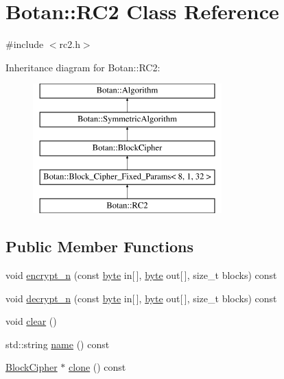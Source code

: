 \hypertarget{classBotan_1_1RC2}{\section{Botan\-:\-:R\-C2 Class Reference}
\label{classBotan_1_1RC2}
}


{\ttfamily \#include $<$rc2.\-h$>$}

Inheritance diagram for Botan\-:\-:R\-C2\-:\begin{figure}[H]
\begin{center}
\leavevmode
\includegraphics[height=5.000000cm]{classBotan_1_1RC2}
\end{center}
\end{figure}
\subsection*{Public Member Functions}
\begin{DoxyCompactItemize}
\item 
void \hyperlink{classBotan_1_1RC2_ab44b8601d594d4e5502d0b4cf01f0440}{encrypt\-\_\-n} (const \hyperlink{namespaceBotan_a7d793989d801281df48c6b19616b8b84}{byte} in\mbox{[}$\,$\mbox{]}, \hyperlink{namespaceBotan_a7d793989d801281df48c6b19616b8b84}{byte} out\mbox{[}$\,$\mbox{]}, size\-\_\-t blocks) const 
\item 
void \hyperlink{classBotan_1_1RC2_ac6135fcb2c2258de5bd06f48def26dca}{decrypt\-\_\-n} (const \hyperlink{namespaceBotan_a7d793989d801281df48c6b19616b8b84}{byte} in\mbox{[}$\,$\mbox{]}, \hyperlink{namespaceBotan_a7d793989d801281df48c6b19616b8b84}{byte} out\mbox{[}$\,$\mbox{]}, size\-\_\-t blocks) const 
\item 
void \hyperlink{classBotan_1_1RC2_a1b2b1f42ed9af1ef5a9957ff2f9f8e3a}{clear} ()
\item 
std\-::string \hyperlink{classBotan_1_1RC2_a221b3e799b06b26ef59b701c6b7cfa26}{name} () const 
\item 
\hyperlink{classBotan_1_1BlockCipher}{Block\-Cipher} $\ast$ \hyperlink{classBotan_1_1RC2_a49061d3f7e52c0e2c66dca7a5768651f}{clone} () const 
\end{DoxyCompactItemize}
